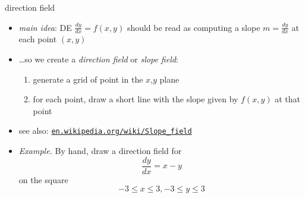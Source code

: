 \documentclass{beamer}
\begin{document}
\begin{frame}{direction field}

\begin{itemize}
\item \emph{main idea}: DE $\frac{dy}{dx} = f(x,y)$ should be read as computing a slope $m=\frac{dy}{dx}$ at each  point $(x,y)$
\item \dots so we create a \emph{direction field} or \emph{slope field}:
    \begin{enumerate}
    \item generate a grid of point in the $x$,$y$ plane
    \item for each point, draw a short line with the slope given by $f(x,y)$ at that point
    \end{enumerate}
\item see also: \small \href{https://en.wikipedia.org/wiki/Slope_field}{\color{cyan} \texttt{en.wikipedia.org/wiki/Slope\_field}} \normalsize

\bigskip
\item \begin{minipage}[t]{0.375\textwidth}
\emph{Example.}  By hand, draw a direction field for
$$\frac{dy}{dx} = x-y$$
on the square
$$-3 \le x \le 3, -3 \le y \le 3$$
\end{minipage} 

\vspace{20mm}
\end{itemize}
\end{frame}
\end{document}
